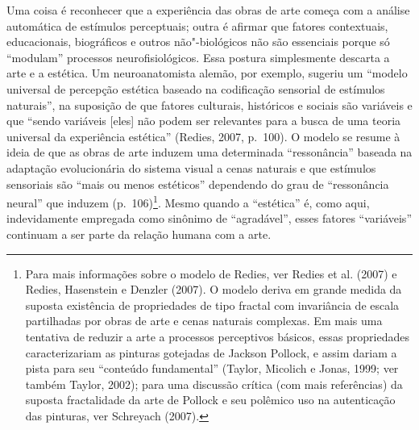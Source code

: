 Uma coisa é reconhecer que a experiência das obras de arte começa com a
análise automática de estímulos perceptuais; outra é afirmar que fatores
contextuais, educacionais, biográficos e outros não"-biológicos não são
essenciais porque só ``modulam'' processos neurofisiológicos. Essa
postura simplesmente descarta a arte e a estética. Um neuroanatomista
alemão, por exemplo, sugeriu um ``modelo universal de percepção estética
baseado na codificação sensorial de estímulos naturais'', na suposição
de que fatores culturais, históricos e sociais são variáveis e que
``sendo variáveis {[}eles{]} não podem ser relevantes para a busca de
uma teoria universal da experiência estética'' (Redies, 2007, p.~100). O
modelo se resume à ideia de que as obras de arte induzem uma determinada
``ressonância'' baseada na adaptação evolucionária do sistema visual a
cenas naturais e que estímulos sensoriais são ``mais ou menos
estéticos'' dependendo do grau de ``ressonância neural'' que induzem
(p.~106)\footnote[17]{Para mais informações sobre o modelo de Redies, ver Redies et al.
(2007) e Redies, Hasenstein e Denzler (2007). O modelo deriva em grande
medida da suposta existência de propriedades de tipo fractal com
invariância de escala partilhadas por obras de arte e cenas naturais
complexas. Em mais uma tentativa de reduzir a arte a processos
perceptivos básicos, essas propriedades caracterizariam as pinturas
gotejadas de Jackson Pollock, e assim dariam a pista para seu ``conteúdo
fundamental'' (Taylor, Micolich e Jonas, 1999; ver também Taylor, 2002);
para uma discussão crítica (com mais referências) da suposta
fractalidade da arte de Pollock e seu polêmico uso na autenticação das
pinturas, ver Schreyach (2007).}. Mesmo quando a ``estética'' é, como aqui,
indevidamente empregada como sinônimo de ``agradável'', esses fatores
``variáveis'' continuam a ser parte da relação humana com a arte.

